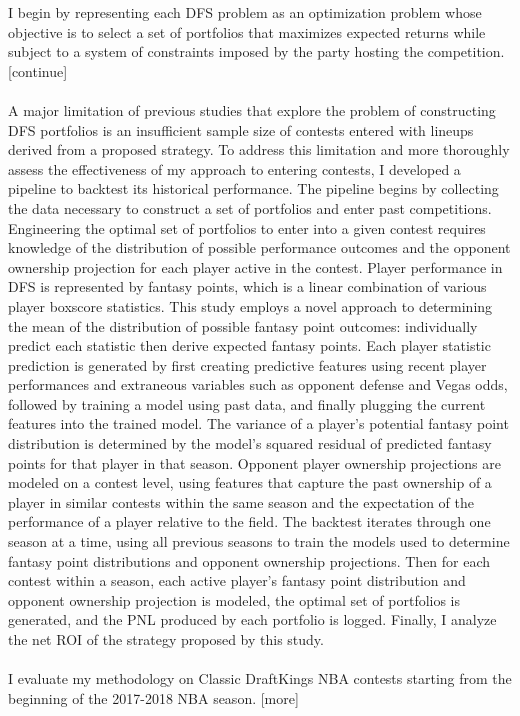 \documentclass{article}
\begin{document}
I begin by representing each DFS problem as an optimization problem whose objective is to select a set of portfolios that maximizes expected returns while subject to a system of constraints imposed by the party hosting the competition. [continue]\\
\\
A major limitation of previous studies that explore the problem of constructing DFS portfolios is an insufficient sample size of contests entered with lineups derived from a proposed strategy. To address this limitation and more thoroughly assess the effectiveness of my approach to entering contests, I developed a pipeline to backtest its historical performance. The pipeline begins by collecting the data necessary to construct a set of portfolios and enter past competitions. Engineering the optimal set of portfolios to enter into a given contest requires knowledge of the distribution of possible performance outcomes and the opponent ownership projection for each player active in the contest. Player performance in DFS is represented by fantasy points, which is a linear combination of various player boxscore statistics. This study employs a novel approach to determining the mean of the distribution of possible fantasy point outcomes: individually predict each statistic then derive expected fantasy points. Each player statistic prediction is generated by first creating predictive features using recent player performances and extraneous variables such as opponent defense and Vegas odds, followed by training a model using past data, and finally plugging the current features into the trained model. The variance of a player's potential fantasy point distribution is determined by the model's squared residual of predicted fantasy points for that player in that season. Opponent player ownership projections are modeled on a contest level, using features that capture the past ownership of a player in similar contests within the same season and the expectation of the performance of a player relative to the field. The backtest iterates through one season at a time, using all previous seasons to train the models used to determine fantasy point distributions and opponent ownership projections. Then for each contest within a season, each active player's fantasy point distribution and opponent ownership projection is modeled, the optimal set of portfolios is generated, and the PNL produced by each portfolio is logged. Finally, I analyze the net ROI of the strategy proposed by this study.\\
\\
I evaluate my methodology on Classic DraftKings NBA contests starting from the beginning of the 2017-2018 NBA season. [more]\\
\\
\end{document}
